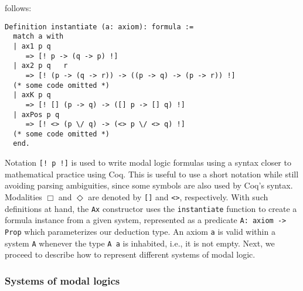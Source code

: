 \documentclass[3p,times]{elsarticle}
\begin{document}
follows:
\begin{verbatim}
Definition instantiate (a: axiom): formula :=
  match a with
  | ax1 p q
     => [! p -> (q -> p) !]
  | ax2 p q   r
     => [! (p -> (q -> r)) -> ((p -> q) -> (p -> r)) !]
  (* some code omitted *)
  | axK p q
     => [! [] (p -> q) -> ([] p -> [] q) !]
  | axPos p q
     => [! <> (p \/ q) -> (<> p \/ <> q) !]
  (* some code omitted *)
  end.
\end{verbatim}
Notation \texttt{[! p !]} is used to write modal logic formulas using a
syntax closer to mathematical practice using Coq. This is useful to use a short notation while still avoiding
parsing ambiguities, since some symbols are also used by Coq's syntax.
Modalities $\Box$ and $\Diamond$ are denoted by \texttt{[]}
and \texttt{<>}, respectively.
%
With such definitions at hand,
the \texttt{Ax} constructor uses the \texttt{instantiate}
function to create a formula instance from a given system,
represented as a predicate
\texttt{A: axiom -> Prop} which parameterizes our deduction type. An
axiom \texttt{a} is valid within a system \texttt{A} whenever
the type \texttt{A a} is inhabited, i.e., it is not empty. Next, we
proceed to
describe how to represent different systems of modal logic.

\subsubsection{Systems of modal logics}
\end{document}
